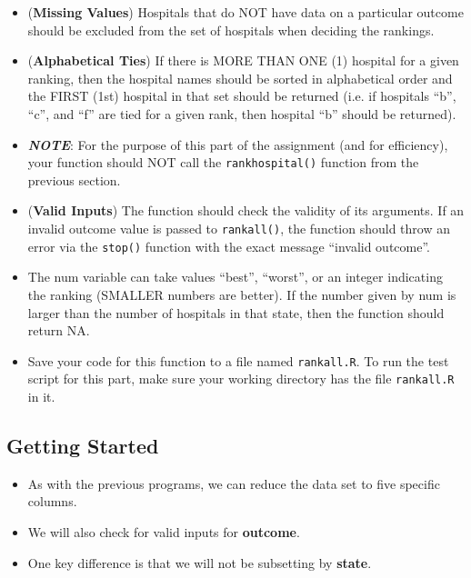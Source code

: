 \documentclass[]{article}
\begin{document}
\begin{itemize}
\item (\textbf{Missing Values}) Hospitals that do NOT have data on a particular outcome should be excluded from the set of hospitals when deciding the rankings.

\item (\textbf{Alphabetical Ties}) If there is MORE THAN ONE (1) hospital for a given ranking, then the hospital names should be sorted in alphabetical order and 
the FIRST (1st) hospital in that set should be returned (i.e. if hospitals “b”, “c”, and “f” are tied for a given rank, then 
hospital “b” should be returned).

\item \textit{\textbf{NOTE}}: For the purpose of this part of the assignment (and for efficiency), your function should NOT call the \texttt{rankhospital()} 
function from the previous section.

\item (\textbf{Valid Inputs}) The function should check the validity of its arguments. If an invalid outcome value is passed to \texttt{rankall()}, the function should 
throw an error via the \texttt{stop()} function with the exact message “invalid outcome”. 

\item The num variable can take values “best”, “worst”,
or an integer indicating the ranking (SMALLER numbers are better). If the number given by num is larger than the number of 
hospitals in that state, then the function should return NA.

\item Save your code for this function to a file named \texttt{rankall.R}. To run the test script for this part, make sure your working directory 
has the file \texttt{rankall.R} in it.
\end{itemize}                                                         

\newpage
\subsection{Getting Started}
\begin{itemize}
\item As with the previous programs, we can reduce the data set to five specific columns.
\item We will also check for valid inputs for \textbf{outcome}.
\item One key difference is that we will not be subsetting by \textbf{state}.
\end{itemize}
\end{document}
